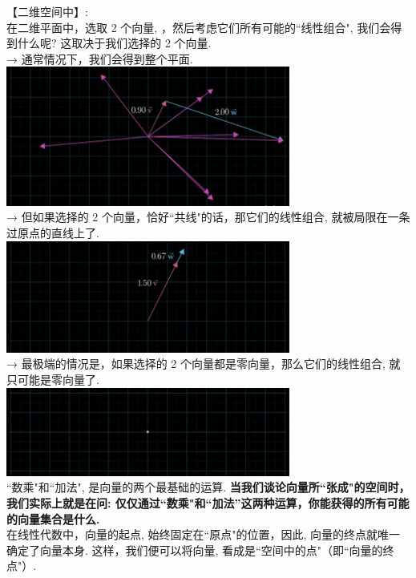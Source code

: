 \documentclass[UTF8]{ctexart}
\begin{document}
【二维空间中】:\\
在二维平面中，选取 2 个向量, ，然后考虑它们所有可能的``线性组合", 我们会得到什么呢? 这取决于我们选择的 2 个向量.\\

→ 通常情况下，我们会得到整个平面.\\
\includegraphics[width=0.7\textwidth]{img/0104.png}\\

→ 但如果选择的 2 个向量，恰好``共线"的话，那它们的线性组合, 就被局限在一条过原点的直线上了. \\
\includegraphics[width=0.7\textwidth]{img/0105.png}\\

→ 最极端的情况是，如果选择的 2 个向量都是零向量，那么它们的线性组合, 就只可能是零向量了. \\
\includegraphics[width=0.7\textwidth]{img/0106.png}\\

``数乘"和``加法", 是向量的两个最基础的运算. \textbf{当我们谈论向量所``张成"的空间时，我们实际上就是在问: 仅仅通过``数乘"和``加法''这两种运算，你能获得的所有可能的向量集合是什么.} \\

在线性代数中，向量的起点, 始终固定在``原点"的位置，因此, 向量的终点就唯一确定了向量本身. 这样，我们便可以将向量, 看成是``空间中的点"（即``向量的终点"）.\\
\end{document}
